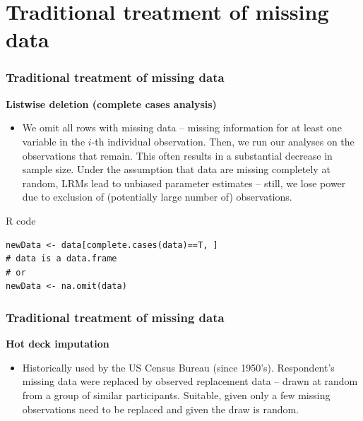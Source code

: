 \documentclass{beamer}
\begin{document}
\section{Traditional treatment of missing data}
\begin{frame}[fragile] %
\frametitle{Traditional treatment of missing data}


\textbf{Listwise deletion (complete cases analysis)}
\vspace{0.2cm}
  \begin{itemize}
  \item  We omit all rows with missing data – missing information for at least one variable in the $i$-th individual observation. Then, we run our analyses on the observations that remain. This often results in a substantial decrease in sample size. Under the assumption that data are missing completely at random, LRMs lead to unbiased parameter estimates – still, we lose power due to exclusion of (potentially large number of) observations.
  \end{itemize} 

\begin{block}{R code}
\begin{verbatim}
newData <- data[complete.cases(data)==T, ] 
# data is a data.frame
# or
newData <- na.omit(data) 
\end{verbatim}
\end{block}

\end{frame}


\begin{frame}
\frametitle{Traditional treatment of missing data}


\textbf{Hot deck imputation}
\vspace{0.2cm}
  \begin{itemize}
  \item  Historically used by the US Census Bureau (since 1950’s). Respondent’s missing data were replaced by observed replacement data – drawn at random from a group of similar participants. Suitable, given only a few missing observations need to be replaced and given the draw is random.
  \end{itemize} 

\end{frame}
\end{document}
